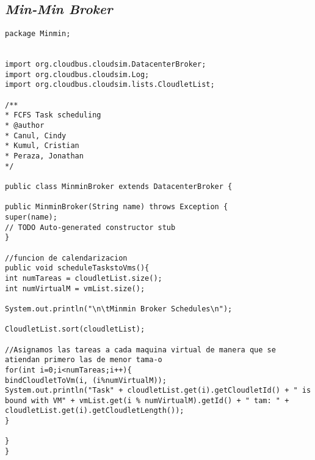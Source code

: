 \subsection*{\textit{Min-Min Broker}}
\begin{lstlisting}
package Minmin;


import org.cloudbus.cloudsim.DatacenterBroker;
import org.cloudbus.cloudsim.Log;
import org.cloudbus.cloudsim.lists.CloudletList;

/**
* FCFS Task scheduling
* @author
* Canul, Cindy
* Kumul, Cristian
* Peraza, Jonathan
*/

public class MinminBroker extends DatacenterBroker {

public MinminBroker(String name) throws Exception {
super(name);
// TODO Auto-generated constructor stub
}

//funcion de calendarizacion
public void scheduleTaskstoVms(){
int numTareas = cloudletList.size();
int numVirtualM = vmList.size();

System.out.println("\n\tMinmin Broker Schedules\n");

CloudletList.sort(cloudletList);

//Asignamos las tareas a cada maquina virtual de manera que se atiendan primero las de menor tama-o
for(int i=0;i<numTareas;i++){
bindCloudletToVm(i, (i%numVirtualM));
System.out.println("Task" + cloudletList.get(i).getCloudletId() + " is bound with VM" + vmList.get(i % numVirtualM).getId() + " tam: " + cloudletList.get(i).getCloudletLength());
}

}
}

\end{lstlisting}

